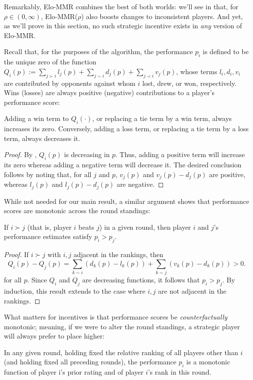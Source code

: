 Remarkably, Elo-MMR combines the best of both worlds: we'll see in  that, for $\rho\in (0,\infty)$, Elo-MMR($\rho$) also boosts changes to inconsistent players. And yet, as we'll prove in this section, no such strategic incentive exists in \emph{any} version of Elo-MMR.

Recall that, for the purposes of the algorithm, the performance $p_i$ is defined to be the unique zero of the function $Q_i(p) := \sum_{j \succ i} l_j(p) + \sum_{j \sim i} d_j(p) + \sum_{j \prec i} v_j(p)$, whose terms $l_i,d_i,v_i$ are contributed by opponents against whom $i$ lost, drew, or won, respectively. Wins (losses) are always positive (negative) contributions to a player's performance score:

\begin{lemma}
\label{lem:mono-term}
Adding a win term to $Q_i(\cdot)$, or replacing a tie term by a win term, always increases its zero. Conversely, adding a loss term, or replacing a tie term by a loss term, always decreases it.
\end{lemma}

\begin{proof}
By , $Q_i(p)$ is decreasing in $p$. Thus, adding a positive term will increase its zero whereas adding a negative term will decrease it. The desired conclusion follows by noting that, for all $j$ and $p$, $v_j(p)$ and $v_j(p)-d_j(p)$ are positive, whereas $l_j(p)$ and $l_j(p)-d_j(p)$ are negative.
\end{proof}

While not needed for our main result, a similar argument shows that performance scores are monotonic across the round standings:

\begin{theorem}
If $i \succ j$ (that is, player $i$ beats $j$) in a given round, then player $i$ and $j$'s performance estimates satisfy $p_i > p_j$.
\end{theorem}

\begin{proof}
If $i \succ j$ with $i,j$ adjacent in the rankings, then
\[Q_i(p) - Q_j(p) = \sum_{k\sim i}(d_k(p) - l_k(p)) + \sum_{k\sim j}(v_k(p) - d_k(p)) > 0.\]
for all $p$. Since $Q_i$ and $Q_j$ are decreasing functions, it follows that $p_i > p_j$. By induction, this result extends to the case where $i,j$ are not adjacent in the rankings.
\end{proof}

What matters for incentives is that performance scores be \emph{counterfactually} monotonic; meaning, if we were to alter the round standings, a strategic player will always prefer to place higher:
\begin{lemma}
\label{lem:mono-perf}
In any given round, holding fixed the relative ranking of all players other than $i$ (and holding fixed all preceding rounds), the performance $p_i$ is a monotonic function of player i's prior rating and of player $i$'s rank in this round.
\end{lemma}

